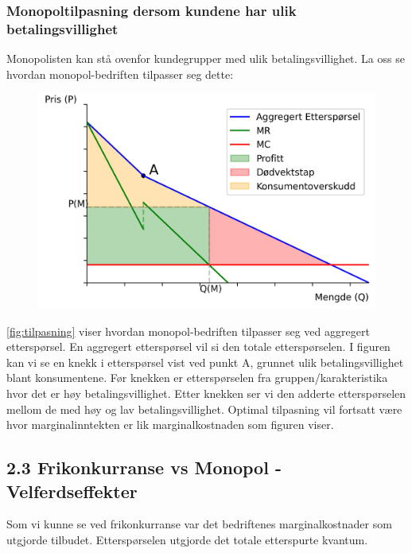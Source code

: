 \documentclass[
  12pt,
  a4paper,
  DIV=11,
  numbers=noendperiod]{scrartcl}
\begin{document}
\subsubsection{Monopoltilpasning dersom kundene har ulik
betalingsvillighet}\label{monopoltilpasning-dersom-kundene-har-ulik-betalingsvillighet}

Monopolisten kan stå ovenfor kundegrupper med ulik betalingsvillighet.
La oss se hvordan monopol-bedriften tilpasser seg dette:

\begin{figure}[h!]
\centering
  \includegraphics[width=\linewidth]{dokumentobjekter/figurer/bedrift_tilplasning.png}
  \label{fig:tilpasning}
\end{figure}

\autoref{fig:tilpasning} viser hvordan monopol-bedriften tilpasser seg
ved aggregert etterspørsel. En aggregert etterspørsel vil si den totale
etterspørselen. I figuren kan vi se en knekk i etterspørsel vist ved
punkt A, grunnet ulik betalingsvillighet blant konsumentene. Før knekken
er etterspørselen fra gruppen/karakteristika hvor det er høy
betalingsvillighet. Etter knekken ser vi den adderte etterspørselen
mellom de med høy og lav betalingsvillighet. Optimal tilpasning vil
fortsatt være hvor marginalinntekten er lik marginalkostnaden som
figuren viser.

\subsection{2.3 Frikonkurranse vs Monopol -
Velferdseffekter}\label{frikonkurranse-vs-monopol---velferdseffekter}

Som vi kunne se ved frikonkurranse var det bedriftenes marginalkostnader
som utgjorde tilbudet. Etterspørselen utgjorde det totale etterspurte
kvantum.
\end{document}
